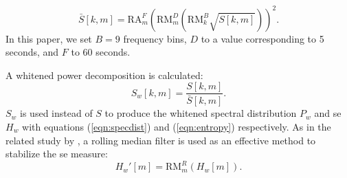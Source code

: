{\begin{equation}
\label{eqn:psdestimate}
    \bar{S}[k, m] = \text{RA}_m^{F} \left( \text{RM}_m^{D} \left(\text{RM}_k^{B} \sqrt{S[k,m]}\right) \right)^2.
\end{equation}
In this paper, we set $B=9$ frequency bins, $D$ to a value corresponding to 5 seconds, and $F$ to 60 seconds. 



A whitened power decomposition is calculated:
\begin{equation}
\label{eqn:whitened_scalogram}
    S_w[k,m] = \frac{S[k,m]}{\bar{S}[k, m]}.
\end{equation}
$S_w$ is used instead of $S$ to produce the whitened spectral distribution $P_w$ and \ac{se} $H_w$ with equations (\ref{eqn:specdist}) and (\ref{eqn:entropy}) respectively. As in the related study by \citet{mypaper}, a rolling median filter is used as an effective method to stabilize the \ac{se} measure:
\begin{equation}
    H_w'[m] = \text{RM}_m^{R} (H_w[m]).
\end{equation}



}
